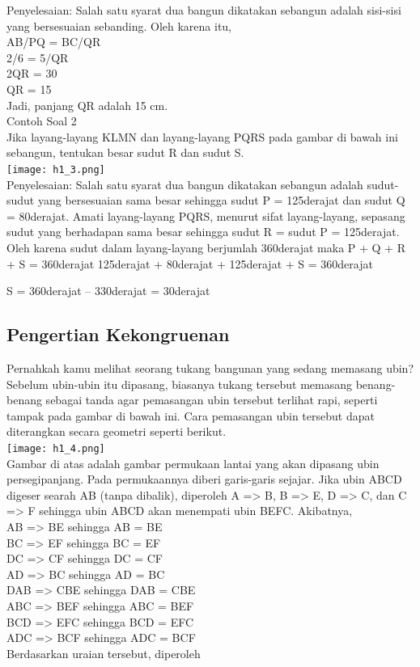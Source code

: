 \documentclass[11pt,fleqn]{book} %
\begin{document}
Penyelesaian:
Salah satu syarat dua bangun dikatakan sebangun adalah sisi-sisi yang bersesuaian sebanding. Oleh karena itu,\\
AB/PQ = BC/QR\\
2/6 = 5/QR\\
2QR = 30\\
QR = 15\\
Jadi, panjang QR adalah 15 cm.\\


Contoh Soal 2\\
Jika layang-layang KLMN dan layang-layang PQRS pada gambar di bawah ini sebangun, tentukan besar sudut R dan sudut S.\\
 \texttt{[image: h1\_3.png]}\\

Penyelesaian:
Salah satu syarat dua bangun dikatakan sebangun adalah sudut-sudut yang bersesuaian sama besar sehingga sudut P = 125derajat dan sudut Q = 80derajat. Amati layang-layang PQRS, menurut sifat layang-layang, sepasang sudut yang berhadapan sama besar sehingga sudut R = sudut P = 125derajat. Oleh karena sudut dalam layang-layang berjumlah 360derajat maka
P + Q + R + S = 360derajat
125derajat + 80derajat + 125derajat + S = 360derajat

S = 360derajat – 330derajat = 30derajat\\


\subsection{Pengertian Kekongruenan}

Pernahkah kamu melihat seorang tukang bangunan yang sedang memasang ubin? Sebelum ubin-ubin itu dipasang, biasanya tukang tersebut memasang benang-benang sebagai tanda agar pemasangan ubin tersebut terlihat rapi, seperti tampak pada gambar di bawah ini. Cara pemasangan ubin tersebut dapat diterangkan secara geometri seperti berikut.\\
 \texttt{[image: h1\_4.png]}\\
Gambar di atas adalah gambar permukaan lantai yang akan dipasang ubin persegipanjang. Pada permukaannya diberi garis-garis sejajar. Jika ubin ABCD digeser searah AB (tanpa dibalik), diperoleh A => B, B => E, D => C, dan C => F sehingga ubin ABCD akan menempati ubin BEFC. Akibatnya,\\
AB => BE sehingga AB = BE\\
BC => EF sehingga BC = EF\\
DC => CF sehingga DC = CF\\
AD => BC sehingga AD = BC\\
DAB =>  CBE sehingga DAB = CBE\\
ABC =>  BEF sehingga ABC = BEF\\
BCD =>  EFC sehingga BCD = EFC\\
ADC =>  BCF sehingga ADC = BCF\\
Berdasarkan uraian tersebut, diperoleh
\end{document}
